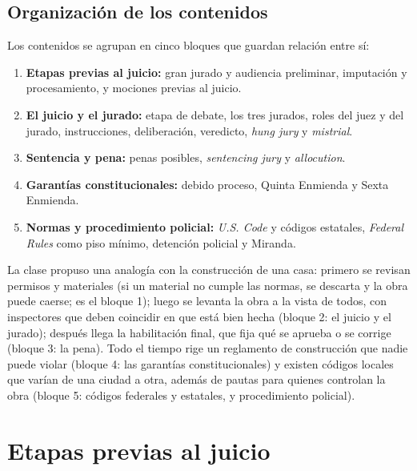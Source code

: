 \documentclass[12pt,oneside]{book}
\begin{document}
\section{Organización de los contenidos}

Los contenidos se agrupan en cinco bloques que guardan relación entre sí:

\begin{enumerate}
    \item \textbf{Etapas previas al juicio:} gran jurado y audiencia preliminar, imputación y procesamiento, y mociones previas al juicio.
    \item \textbf{El juicio y el jurado:} etapa de debate, los tres jurados, roles del juez y del jurado, instrucciones, deliberación, veredicto, \textit{hung jury} y \textit{mistrial}.
    \item \textbf{Sentencia y pena:} penas posibles, \textit{sentencing jury} y \textit{allocution}.
    \item \textbf{Garantías constitucionales:} debido proceso, Quinta Enmienda y Sexta Enmienda.
    \item \textbf{Normas y procedimiento policial:} \textit{U.S. Code} y códigos estatales, \textit{Federal Rules} como piso mínimo, detención policial y Miranda.
\end{enumerate}

\begin{note}
La clase propuso una analogía con la construcción de una casa: primero se revisan permisos y materiales (si un material no cumple las normas, se descarta y la obra puede caerse; es el bloque 1); luego se levanta la obra a la vista de todos, con inspectores que deben coincidir en que está bien hecha (bloque 2: el juicio y el jurado); después llega la habilitación final, que fija qué se aprueba o se corrige (bloque 3: la pena). Todo el tiempo rige un reglamento de construcción que nadie puede violar (bloque 4: las garantías constitucionales) y existen códigos locales que varían de una ciudad a otra, además de pautas para quienes controlan la obra (bloque 5: códigos federales y estatales, y procedimiento policial).
\end{note}

\chapter[Etapas previas al juicio]{Etapas previas al juicio}
\end{document}
